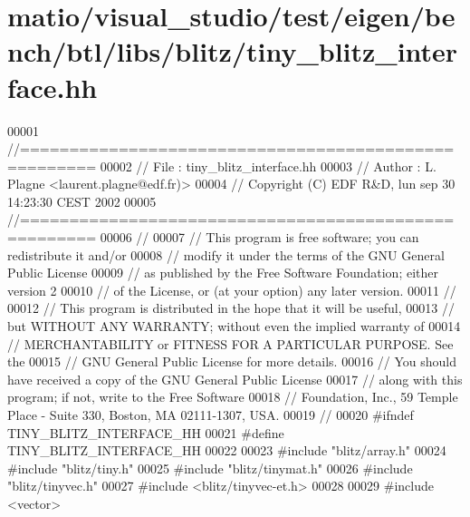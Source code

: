 \hypertarget{matio_2visual__studio_2test_2eigen_2bench_2btl_2libs_2blitz_2tiny__blitz__interface_8hh_source}{}\section{matio/visual\+\_\+studio/test/eigen/bench/btl/libs/blitz/tiny\+\_\+blitz\+\_\+interface.hh}
\label{matio_2visual__studio_2test_2eigen_2bench_2btl_2libs_2blitz_2tiny__blitz__interface_8hh_source}

\begin{DoxyCode}
00001 \textcolor{comment}{//=====================================================}
00002 \textcolor{comment}{// File   :  tiny\_blitz\_interface.hh}
00003 \textcolor{comment}{// Author :  L. Plagne <laurent.plagne@edf.fr)>}
00004 \textcolor{comment}{// Copyright (C) EDF R&D,  lun sep 30 14:23:30 CEST 2002}
00005 \textcolor{comment}{//=====================================================}
00006 \textcolor{comment}{//}
00007 \textcolor{comment}{// This program is free software; you can redistribute it and/or}
00008 \textcolor{comment}{// modify it under the terms of the GNU General Public License}
00009 \textcolor{comment}{// as published by the Free Software Foundation; either version 2}
00010 \textcolor{comment}{// of the License, or (at your option) any later version.}
00011 \textcolor{comment}{//}
00012 \textcolor{comment}{// This program is distributed in the hope that it will be useful,}
00013 \textcolor{comment}{// but WITHOUT ANY WARRANTY; without even the implied warranty of}
00014 \textcolor{comment}{// MERCHANTABILITY or FITNESS FOR A PARTICULAR PURPOSE.  See the}
00015 \textcolor{comment}{// GNU General Public License for more details.}
00016 \textcolor{comment}{// You should have received a copy of the GNU General Public License}
00017 \textcolor{comment}{// along with this program; if not, write to the Free Software}
00018 \textcolor{comment}{// Foundation, Inc., 59 Temple Place - Suite 330, Boston, MA  02111-1307, USA.}
00019 \textcolor{comment}{//}
00020 \textcolor{preprocessor}{#ifndef TINY\_BLITZ\_INTERFACE\_HH}
00021 \textcolor{preprocessor}{#define TINY\_BLITZ\_INTERFACE\_HH}
00022 
00023 \textcolor{preprocessor}{#include "blitz/array.h"}
00024 \textcolor{preprocessor}{#include "blitz/tiny.h"}
00025 \textcolor{preprocessor}{#include "blitz/tinymat.h"}
00026 \textcolor{preprocessor}{#include "blitz/tinyvec.h"}
00027 \textcolor{preprocessor}{#include <blitz/tinyvec-et.h>}
00028 
00029 \textcolor{preprocessor}{#include <vector>}

\end{DoxyCode}
